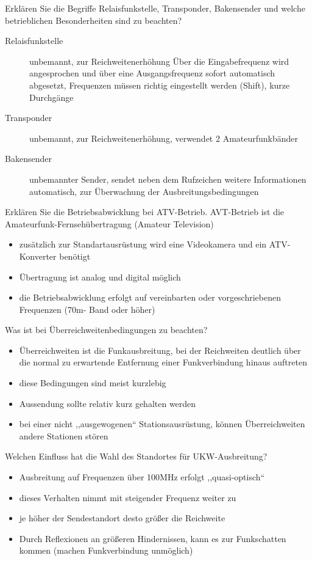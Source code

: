 \documentclass[avery5371,grid,frame,a4paper]{flashcards}
\newcommand{\card}[3]{
  \begin{flashcard}[{\chap} -- #1]{#2}#3\end{flashcard}
}
\begin{document}
\card{63}{Erklären Sie die Begriffe Relaisfunkstelle, Transponder, Bakensender und welche betrieblichen Besonderheiten sind zu beachten?}{
  \small
  \begin{description}
    \item[Relaisfunkstelle] unbemannt, zur Reichweitenerhöhung
      Über die Eingabefrequenz wird angesprochen und über eine Ausgangsfrequenz sofort automatisch abgesetzt, Frequenzen müssen richtig eingestellt werden (Shift), kurze Durchgänge
    \item[Transponder] unbemannt, zur Reichweitenerhöhung, verwendet 2 Amateurfunkbänder
    \item[Bakensender] unbemannter Sender, sendet neben dem Rufzeichen weitere Informationen automatisch, zur Überwachung der Ausbreitungsbedingungen
  \end{description}
}
\card{64}{Erklären Sie die Betriebsabwicklung bei ATV-Betrieb.}{
  AVT-Betrieb ist die Amateurfunk-Fernsehübertragung (Amateur Television)
  \begin{itemize}
    \item zusätzlich zur Standartausrüstung wird eine Videokamera und ein ATV-Konverter benötigt
    \item Übertragung ist analog und digital möglich
    \item die Betriebsabwicklung erfolgt auf vereinbarten oder vorgeschriebenen Frequenzen (70m- Band oder höher)
  \end{itemize}
}
\card{65}{Was ist bei Überreichweitenbedingungen zu beachten?}{
  \small
  \begin{itemize}
    \item Überreichweiten ist die Funkausbreitung, bei der Reichweiten deutlich über die normal zu erwartende Entfernung einer Funkverbindung hinaus auftreten
    \item diese Bedingungen sind meist kurzlebig
    \item Aussendung sollte relativ kurz gehalten werden
    \item bei einer nicht ,,ausgewogenen`` Stationsausrüstung, können Überreichweiten andere Stationen stören
  \end{itemize}
}
\card{66}{Welchen Einfluss hat die Wahl des Standortes für UKW-Ausbreitung?}{
  \begin{itemize}\itemsep0pt
    \item Ausbreitung auf Frequenzen über 100MHz erfolgt ,,quasi-optisch``
    \item dieses Verhalten nimmt mit steigender Frequenz weiter zu
    \item je höher der Sendestandort desto größer die Reichweite
    \item Durch Reflexionen an größeren Hindernissen, kann es zur Funkschatten kommen (machen Funkverbindung unmöglich)
  \end{itemize}
}
\end{document}
